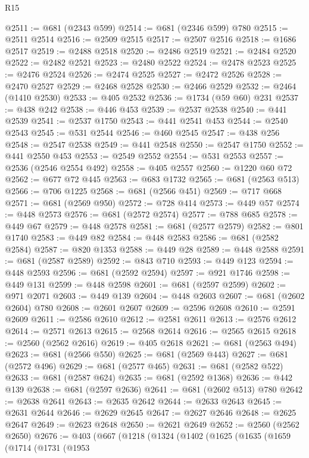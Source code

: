 \begin{lexlean}{R15}
\begin{coremodule}
@2511 := @681 (@2343 @599)
@2514 := @681 (@2346 @599) @780
@2515 := @2511 @2514
@2516 := @2509 @2515
@2517 := @2507 @2516
@2518 := @1686 @2517
@2519 := @2488 @2518
@2520 := @2486 @2519
@2521 := @2484 @2520
@2522 := @2482 @2521
@2523 := @2480 @2522
@2524 := @2478 @2523
@2525 := @2476 @2524
@2526 := @2474 @2525
@2527 := @2472 @2526
@2528 := @2470 @2527
@2529 := @2468 @2528
@2530 := @2466 @2529
@2532 := @2464 (@1410 @2530)
@2533 := @405 @2532
@2536 := @1734 (@59 @60) @231
@2537 := @438 @242
@2538 := @446 @453
@2539 := @2537 @2538
@2540 := @441 @2539
@2541 := @2537 @1750
@2543 := @441 @2541 @453
@2544 := @2540 @2543
@2545 := @531 @2544
@2546 := @460 @2545
@2547 := @438 @256
@2548 := @2547 @2538
@2549 := @441 @2548
@2550 := @2547 @1750
@2552 := @441 @2550 @453
@2553 := @2549 @2552
@2554 := @531 @2553
@2557 := @2536 (@2546 @2554 @492)
@2558 := @405 @2557
@2560 := @1220 @60 @72
@2562 := @677 @72 @445
@2563 := @683 @1732
@2565 := @681 (@2563 @513)
@2566 := @706 @1225
@2568 := @681 (@2566 @451)
@2569 := @717 @668
@2571 := @681 (@2569 @950)
@2572 := @728 @414
@2573 := @449 @57
@2574 := @448 @2573
@2576 := @681 (@2572 @2574)
@2577 := @788 @685
@2578 := @449 @67
@2579 := @448 @2578
@2581 := @681 (@2577 @2579)
@2582 := @801 @1740
@2583 := @449 @82
@2584 := @448 @2583
@2586 := @681 (@2582 @2584)
@2587 := @820 @1353
@2588 := @449 @28
@2589 := @448 @2588
@2591 := @681 (@2587 @2589)
@2592 := @843 @710
@2593 := @449 @123
@2594 := @448 @2593
@2596 := @681 (@2592 @2594)
@2597 := @921 @1746
@2598 := @449 @131
@2599 := @448 @2598
@2601 := @681 (@2597 @2599)
@2602 := @971 @2071
@2603 := @449 @139
@2604 := @448 @2603
@2607 := @681 (@2602 @2604) @780
@2608 := @2601 @2607
@2609 := @2596 @2608
@2610 := @2591 @2609
@2611 := @2586 @2610
@2612 := @2581 @2611
@2613 := @2576 @2612
@2614 := @2571 @2613
@2615 := @2568 @2614
@2616 := @2565 @2615
@2618 := @2560 (@2562 @2616)
@2619 := @405 @2618
@2621 := @681 (@2563 @494)
@2623 := @681 (@2566 @550)
@2625 := @681 (@2569 @443)
@2627 := @681 (@2572 @496)
@2629 := @681 (@2577 @465)
@2631 := @681 (@2582 @522)
@2633 := @681 (@2587 @624)
@2635 := @681 (@2592 @1368)
@2636 := @442 @139
@2638 := @681 (@2597 @2636)
@2641 := @681 (@2602 @513) @780
@2642 := @2638 @2641
@2643 := @2635 @2642
@2644 := @2633 @2643
@2645 := @2631 @2644
@2646 := @2629 @2645
@2647 := @2627 @2646
@2648 := @2625 @2647
@2649 := @2623 @2648
@2650 := @2621 @2649
@2652 := @2560 (@2562 @2650)
@2676 := @403
    (@667
      (@1218
        (@1324
          (@1402
            (@1625
              (@1635
                (@1659
                  (@1714
                    (@1731
                      (@1953

\end{coremodule}
\end{lexlean}
